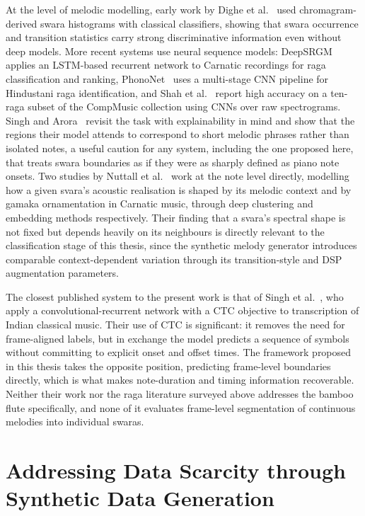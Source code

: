 At the level of melodic modelling, early work by Dighe et al.~\cite{ref29} used chromagram-derived swara histograms with classical classifiers, showing that swara occurrence and transition statistics carry strong discriminative information even without deep models. More recent systems use neural sequence models: DeepSRGM~\cite{ref30} applies an LSTM-based recurrent network to Carnatic recordings for raga classification and ranking, PhonoNet~\cite{ref31} uses a multi-stage CNN pipeline for Hindustani raga identification, and Shah et al.~\cite{ref32} report high accuracy on a ten-raga subset of the CompMusic collection using CNNs over raw spectrograms. Singh and Arora~\cite{ref33} revisit the task with explainability in mind and show that the regions their model attends to correspond to short melodic phrases rather than isolated notes, a useful caution for any system, including the one proposed here, that treats swara boundaries as if they were as sharply defined as piano note onsets. Two studies by Nuttall et al.~\cite{ref34,ref35} work at the note level directly, modelling how a given svara's acoustic realisation is shaped by its melodic context and by gamaka ornamentation in Carnatic music, through deep clustering and embedding methods respectively. Their finding that a svara's spectral shape is not fixed but depends heavily on its neighbours is directly relevant to the classification stage of this thesis, since the synthetic melody generator introduces comparable context-dependent variation through its transition-style and DSP augmentation parameters.

The closest published system to the present work is that of Singh et al.~\cite{ref36}, who apply a convolutional-recurrent network with a CTC objective to transcription of Indian classical music. Their use of CTC is significant: it removes the need for frame-aligned labels, but in exchange the model predicts a sequence of symbols without committing to explicit onset and offset times. The framework proposed in this thesis takes the opposite position, predicting frame-level boundaries directly, which is what makes note-duration and timing information recoverable. Neither their work nor the raga literature surveyed above addresses the bamboo flute specifically, and none of it evaluates frame-level segmentation of continuous melodies into individual swaras.

\section{Addressing Data Scarcity through Synthetic Data Generation}
\label{sec:synthetic}


